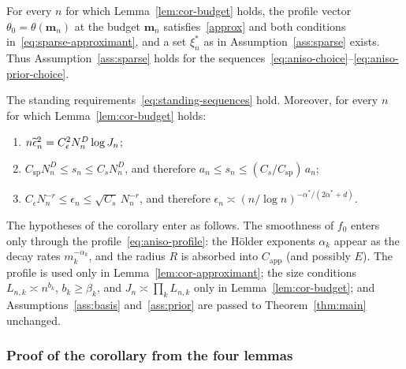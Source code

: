 \begin{auxlemma}\label{lem:cor-approximant}
For every $n$ for which Lemma~\ref{lem:cor-budget} holds, the profile vector $\theta_0=\theta(\boldsymbol m_n)$ at the budget $\boldsymbol m_n$ satisfies~\eqref{approx} and both conditions in~\eqref{eq:sparse-approximant}, and a set $\xi_n^*$ as in Assumption~\ref{ass:sparse} exists. Thus Assumption~\ref{ass:sparse} holds for the sequences~\eqref{eq:aniso-choice}--\eqref{eq:aniso-prior-choice}.
\end{auxlemma}

\begin{auxlemma}\label{lem:cor-rates}
The standing requirements~\eqref{eq:standing-sequences} hold. Moreover, for every $n$ for which Lemma~\ref{lem:cor-budget} holds:
\begin{enumerate}[label=(\alph*),itemsep=1pt]
\item $n\widetilde{\epsilon}_n^2=C_\epsilon^2N_n^D\log J_n$;
\item $C_{\mathrm{sp}}N_n^D\leq s_n\leq C_sN_n^D$, and therefore $a_n\leq s_n\leq(C_s/C_{\mathrm{sp}})\,a_n$;
\item $C_\epsilon N_n^{-r}\leq\epsilon_n\leq\sqrt{C_s}\,N_n^{-r}$, and therefore $\epsilon_n\asymp(n/\log n)^{-\alpha^*/(2\alpha^*+d)}$.
\end{enumerate}
\end{auxlemma}

The hypotheses of the corollary enter as follows. The smoothness of $f_0$ enters only through the profile~\eqref{eq:aniso-profile}: the H\"older exponents $\alpha_k$ appear as the decay rates $m_k^{-\alpha_k}$, and the radius $R$ is absorbed into $C_{\mathrm{app}}$ (and possibly $E$). The profile is used only in Lemma~\ref{lem:cor-approximant}; the size conditions $L_{n,k}\asymp n^{b_k}$, $b_k\geq\beta_k$, and $J_n\asymp\prod_kL_{n,k}$ only in Lemma~\ref{lem:cor-budget}; and Assumptions~\ref{ass:basis} and~\ref{ass:prior} are passed to Theorem~\ref{thm:main} unchanged.

\subsubsection*{Proof of the corollary from the four lemmas}


